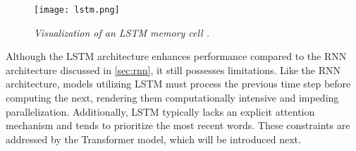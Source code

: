 \begin{figure}[H]
    \centering
    \texttt{[image: lstm.png]}
    \caption{
        \it{Visualization of an LSTM memory cell \cite{schmidt2019recurrent}.}
    }
    \label{fig:lstm}
\end{figure}

Although the LSTM architecture enhances performance compared to the RNN architecture discussed in \autoref{sec:rnn}, it still possesses limitations. Like the RNN architecture, models utilizing LSTM must process the previous time step before computing the next, rendering them computationally intensive and impeding parallelization. Additionally, LSTM typically lacks an explicit attention mechanism and tends to prioritize the most recent words. These constraints are addressed by the Transformer model, which will be introduced next.
